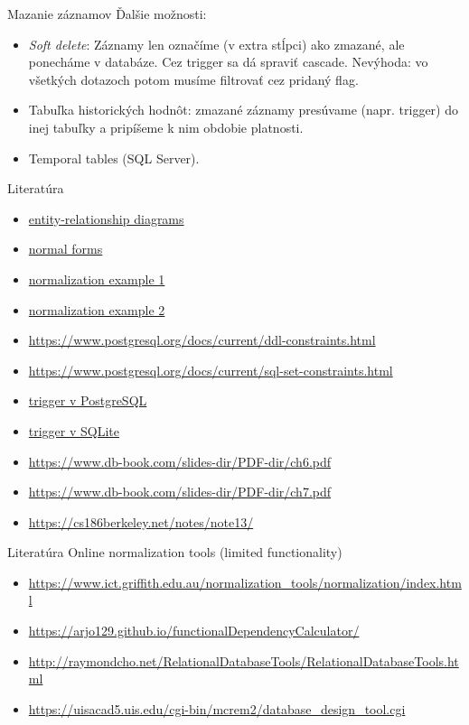 \documentclass[12pt]{beamer}
\begin{document}
\begin{frame}[fragile]{Mazanie záznamov}
Ďalšie možnosti:
\begin{itemize}
\item {\emph{Soft delete}}: Záznamy len označíme (v extra stĺpci) ako zmazané, ale ponecháme v databáze. Cez trigger sa dá spraviť cascade.
Nevýhoda: vo všetkých dotazoch potom musíme filtrovať cez pridaný flag.
\item Tabuľka historických hodnôt: zmazané záznamy presúvame (napr. trigger) do inej tabuľky a pripíšeme k nim obdobie platnosti.
\item Temporal tables (SQL Server).
\end{itemize}
\end{frame}


\begin{frame}{Literatúra}
\begin{itemize}
\item {\scriptsize\href{https://www.lucidchart.com/pages/er-diagrams}{entity-relationship diagrams}}
\item {\scriptsize\href{https://en.wikipedia.org/wiki/Database_normalization}{normal forms}}
\item {\scriptsize\href{https://mariadb.com/kb/en/database-normalization-overview/}{normalization example 1}}
\item {\scriptsize\href{https://www.databasestar.com/database-normalization/}{normalization example 2}}
\item {\scriptsize\url{https://www.postgresql.org/docs/current/ddl-constraints.html}}
\item {\scriptsize\url{https://www.postgresql.org/docs/current/sql-set-constraints.html}}
\item {\scriptsize\href{https://www.postgresqltutorial.com/postgresql-triggers/creating-first-trigger-postgresql/}{trigger v PostgreSQL}}
\item {\scriptsize\href{https://www.sqlitetutorial.net/sqlite-trigger/}{trigger v SQLite}}
\item {\scriptsize\url{https://www.db-book.com/slides-dir/PDF-dir/ch6.pdf}}
\item {\scriptsize\url{https://www.db-book.com/slides-dir/PDF-dir/ch7.pdf}}
\item {\scriptsize\url{https://cs186berkeley.net/notes/note13/}}
\end{itemize}
\end{frame}


\begin{frame}{Literatúra}
Online normalization tools (limited functionality)
\begin{itemize}
\item {\scriptsize\url{https://www.ict.griffith.edu.au/normalization_tools/normalization/index.html}}
\item {\scriptsize\url{https://arjo129.github.io/functionalDependencyCalculator/}}
\item {\scriptsize\url{http://raymondcho.net/RelationalDatabaseTools/RelationalDatabaseTools.html}}
\item {\scriptsize\url{https://uisacad5.uis.edu/cgi-bin/mcrem2/database_design_tool.cgi}}
\end{itemize}
\end{frame}
\end{document}

